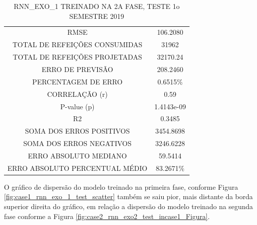             \begin{table}[!ht]
            \centering
            \caption{RNN\_EXO\_1 TREINADO NA 2A FASE, TESTE 1o SEMESTRE 2019}
            \label{table:case2_rnn_exo_2_incase1}
                \begin{tabular}{c|c}
                \rowcolor{gray!50}
                \hline
                \multicolumn{2}{c}{RNN\_EXO\_1 TREINADO NA 2A FASE, TESTE 1o SEMESTRE 2019}\\ \hline
                RMSE & 106.2080\\
                TOTAL DE REFEIÇÕES CONSUMIDAS & 31962\\
                TOTAL DE REFEIÇÕES PROJETADAS & 32170.24\\
                ERRO DE PREVISÃO & 208.2460 \\
                PERCENTAGEM DE ERRO & 0.6515\%  \\
                CORRELAÇÃO (r)& 0.59 \\
                P-value (p) & 1.4143e-09\\
                R2 & 0.3485\\
                SOMA DOS ERROS POSITIVOS & 3454.8698\\
                SOMA DOS ERROS NEGATIVOS & 3246.6228\\
                ERRO ABSOLUTO MEDIANO & 59.5414\\
                ERRO ABSOLUTO PERCENTUAL MÉDIO & 83.2671\% \\ \hline
            \end{tabular}
            \end{table}
                
            
            
        O gráfico de dispersão do modelo treinado na primeira fase, conforme Figura \ref{fig:case1_rnn_exo_1_test_scatter} também se saiu pior, mais distante da borda superior direita do gráfico, em relação a dispersão do modelo treinado na segunda fase conforme a Figura \ref{fig:case2_rnn_exo2_test_incase1_Figura}.
        
